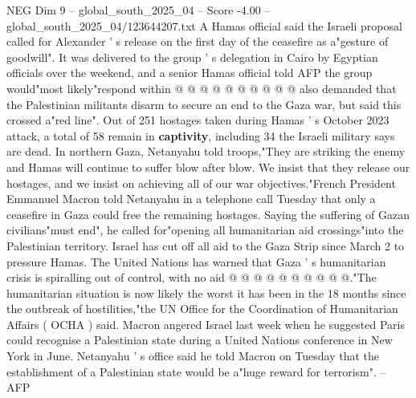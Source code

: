 \begin{textsample}{NEG Dim 9 – global\_south\_2025\_04 – Score -4.00 – global\_south\_2025\_04/123644207.txt}
A Hamas official said the Israeli proposal called for Alexander ' s release on the first day of the ceasefire as a"gesture of goodwill".
It was delivered to the group ' s delegation in Cairo by Egyptian officials over the weekend, and a senior Hamas official told AFP the group would"most likely"respond within @ @ @ @ @ @ @ @ @ @ also demanded that the Palestinian militants disarm to secure an end to the Gaza war, but said this crossed a"red line".
Out of 251 hostages taken during Hamas ' s October 2023 attack, a total of 58 remain in \textbf{captivity}, including 34 the Israeli military says are dead.
In northern Gaza, Netanyahu told troops,"They are striking the enemy and Hamas will continue to suffer blow after blow.
We insist that they release our hostages, and we insist on achieving all of our war objectives."French President Emmanuel Macron told Netanyahu in a telephone call Tuesday that only a ceasefire in Gaza could free the remaining hostages.
Saying the suffering of Gazan civilians"must end", he called for"opening all humanitarian aid crossings"into the Palestinian territory.
Israel has cut off all aid to the Gaza Strip since March 2 to pressure Hamas.
The United Nations has warned that Gaza ' s humanitarian crisis is spiralling out of control, with no aid @ @ @ @ @ @ @ @ @ @."The humanitarian situation is now likely the worst it has been in the 18 months since the outbreak of hostilities,"the UN Office for the Coordination of Humanitarian Affairs ( OCHA ) said.
Macron angered Israel last week when he suggested Paris could recognise a Palestinian state during a United Nations conference in New York in June.
Netanyahu ' s office said he told Macron on Tuesday that the establishment of a Palestinian state would be a"huge reward for terrorism". -- AFP

\end{textsample}
